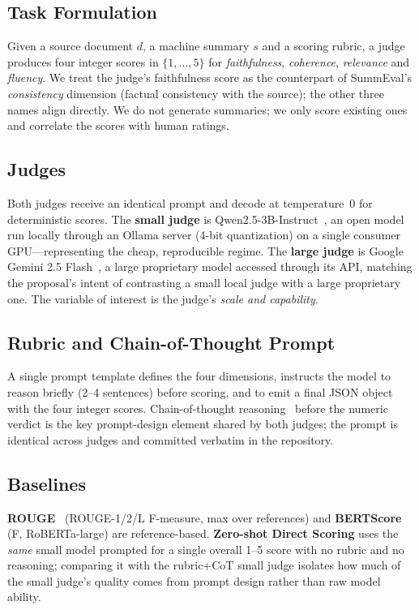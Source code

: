 \documentclass[runningheads]{llncs}
\begin{document}
\subsection{Task Formulation}
Given a source document $d$, a machine summary $s$ and a scoring rubric, a judge
produces four integer scores in $\{1,\dots,5\}$ for \emph{faithfulness},
\emph{coherence}, \emph{relevance} and \emph{fluency}. We treat the judge's
faithfulness score as the counterpart of SummEval's \emph{consistency} dimension
(factual consistency with the source); the other three names align directly. We do
not generate summaries; we only score existing ones and correlate the scores with
human ratings.

\subsection{Judges}
Both judges receive an identical prompt and decode at temperature~0 for
deterministic scores. The \textbf{small judge} is Qwen2.5-3B-Instruct~\cite{qwen2025},
an open model run locally through an Ollama server (4-bit quantization) on a single
consumer GPU---representing the cheap, reproducible regime. The \textbf{large judge}
is Google Gemini 2.5 Flash~\cite{gemini2024}, a large proprietary model accessed
through its API, matching the proposal's intent of contrasting a small local judge
with a large proprietary one. The variable of interest is the judge's
\emph{scale and capability}.

\subsection{Rubric and Chain-of-Thought Prompt}
A single prompt template defines the four dimensions, instructs the model to reason
briefly (2--4 sentences) before scoring, and to emit a final JSON object with the
four integer scores. Chain-of-thought reasoning~\cite{wei2022chain} before the
numeric verdict is the key prompt-design element shared by both judges; the prompt
is identical across judges and committed verbatim in the repository.

\subsection{Baselines}
\textbf{ROUGE}~\cite{lin2004rouge} (ROUGE-1/2/L F-measure, max over references) and
\textbf{BERTScore}~\cite{zhang2020bertscore} (F, RoBERTa-large) are reference-based.
\textbf{Zero-shot Direct Scoring} uses the \emph{same} small model prompted for a
single overall 1--5 score with no rubric and no reasoning; comparing it with the
rubric+CoT small judge isolates how much of the small judge's quality comes from
prompt design rather than raw model ability.
\end{document}
